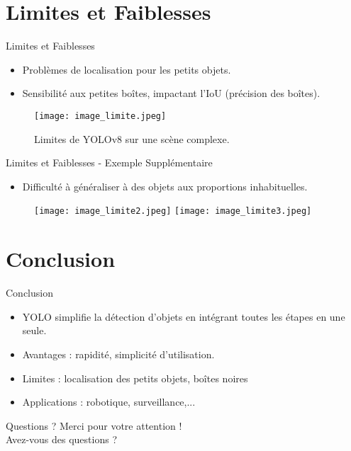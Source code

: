 \documentclass{beamer}
\begin{document}

\section{Limites et Faiblesses}
\begin{frame}{Limites et Faiblesses}
    \begin{itemize}
        \item Problèmes de localisation pour les petits objets.\pause
        \item Sensibilité aux petites boîtes, impactant l'IoU (précision des boîtes).\pause
    \end{itemize}

    \begin{figure}
        \centering
        \texttt{[image: image\_limite.jpeg]}
        \caption{Limites de YOLOv8 sur une scène complexe.}
    \end{figure}
\end{frame}


\begin{frame}{Limites et Faiblesses - Exemple Supplémentaire}
    \begin{itemize}
        \item Difficulté à généraliser à des objets aux proportions inhabituelles.\pause
    \end{itemize}
    \begin{figure}
        \centering
        \texttt{[image: image\_limite2.jpeg]}\pause
        \hspace{0.5cm}
        \texttt{[image: image\_limite3.jpeg]}
    \end{figure}
\end{frame}





\section{Conclusion}
\begin{frame}{Conclusion}
    \begin{itemize}
        \item YOLO simplifie la détection d'objets en intégrant toutes les étapes en une seule.
        \item Avantages : rapidité, simplicité d'utilisation.
        \item Limites : localisation des petits objets, boîtes noires 
        \item Applications : robotique, surveillance,...
    \end{itemize}
\end{frame}




\begin{frame}{Questions ?}
    \centering
    Merci pour votre attention ! \\
    Avez-vous des questions ?
\end{frame}
\end{document}
